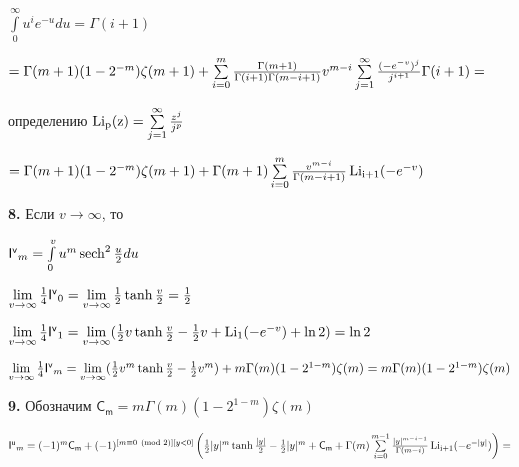 \documentclass[a4paper,12pt]{article}
\begin{document}
 $\int\limits_0^{\infty} u^{i} e^{-u}d u = \Gamma(i + 1)$

\begin{center}
    $= \Gamma(m + 1)(1 - 2^{- m})\zeta(m + 1) + \sum\limits_{i = 0}^m {\Gamma(m + 1)\over{\Gamma(i + 1) \Gamma(m - i + 1)}} v^{m - i} \sum\limits_{j = 1}^{\infty} {(-e^{-v})^j\over{j^{i + 1}}} \Gamma(i + 1) = $
\end{center}

 определению $\operatorname{Li_p(z)} = \sum\limits_{j = 1}^{\infty} {z^{j}\over{j^p}}$

\begin{center}
    $= \Gamma(m + 1)(1 - 2^{- m})\zeta(m + 1) + \Gamma(m + 1)\sum\limits_{i = 0}^m {v^{m - i}\over{\Gamma(m - i + 1)}} \operatorname{Li_{i + 1}}(-e^{-v})$
\end{center}

\noindent\textbf{8.} Если $v \longrightarrow \infty$, то

\begin{center}
    $\mathsf{I^{v}}_m = \int\limits_0^{v} u^m \operatorname{sech}^2{u\over{2}} d u$
\end{center}

\begin{center}
    $\lim\limits_{v \rightarrow \infty} {1\over{4}}\mathsf{I^{v}}_0 = \lim\limits_{v \rightarrow \infty} {1\over{2}} \operatorname{tanh}{v\over{2}} = {1\over{2}}$
\end{center}

\begin{center}
    $\lim\limits_{v \rightarrow \infty} {1\over{4}} \mathsf{I^{v}}_1 = \lim\limits_{v \rightarrow \infty} ({1\over{2}} v\operatorname{tanh}{v\over{2}} - {1\over{2}}v + \operatorname{Li_1}(-e^{-v}) + \ln{2}) = \ln{2}$
\end{center}

\begin{center}
    $\lim\limits_{v \rightarrow \infty} {1\over{4}} \mathsf{I^{v}}_m = \lim\limits_{v \rightarrow \infty} ({1\over{2}} v^m \operatorname{tanh}{v\over{2}} - {1\over{2}}v^m) + m \Gamma(m)(1 - 2^{1 - m})\zeta(m) = m \Gamma(m)(1 - 2^{1 - m})\zeta(m)$
\end{center}

\noindent\textbf{9.} Обозначим $\mathsf{C_m} = m \Gamma(m)(1 - 2^{1 - m})\zeta(m)$

\begin{center}
    $\mathsf{I^u}_m = (-1)^m \mathsf{C_m} + (-1)^{[m \equiv 0 \pmod{2}][y < 0]} \left({1\over{2}}|y|^m \operatorname{tanh}{|y|\over{2}} - {1\over{2}}|y|^m + \mathsf{C_m} + \Gamma(m)\sum\limits_{i = 0}^{m - 1} {|y|^{m - i - 1}\over{\Gamma(m - i)}} \operatorname{Li_{i + 1}}(-e^{-|y|})\right) =$
\end{center}
\end{document}

